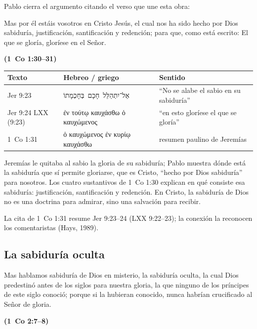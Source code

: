 \documentclass[11pt,letterpaper]{article}
\newcommand{\heb}[1]{\mbox{\foreignlanguage{hebrew}{#1}}}
\newcommand{\grc}[1]{\foreignlanguage{ancientgreek}{#1}}
\newcommand{\fuente}[1]{\par\hfill{\upshape\bfseries\small\textcolor{azul}{#1}}}
\begin{document}
Pablo cierra el argumento citando el verso que une esta obra:

\begin{cita}Mas por él estáis vosotros en Cristo Jesús, el cual nos ha sido hecho por Dios sabiduría, justificación, santificación y redención; para que, como está escrito: El que se gloría, gloríese en el Señor.\fuente{(1~Co 1:30--31)}\end{cita}

\begin{center}\small\renewcommand{\arraystretch}{1.3}
\begin{tabular}{@{}L{2.4cm}L{6.0cm}L{6.0cm}@{}}
\toprule
\textbf{Texto} & \textbf{Hebreo / griego} & \textbf{Sentido} \\ \midrule
Jer 9:23 & \heb{אַל־יִתְהַלֵּל חָכָם בְּחָכְמָתוֹ} & ``No se alabe el sabio en su sabiduría'' \\
Jer 9:24 LXX (9:23) & \grc{ἐν τούτῳ καυχάσθω ὁ καυχώμενος} & ``en esto gloríese el que se gloría'' \\
1~Co 1:31 & \grc{ὁ καυχώμενος ἐν κυρίῳ καυχάσθω} & resumen paulino de Jeremías \\
\bottomrule
\end{tabular}\end{center}

Jeremías le quitaba al sabio la gloria de su sabiduría; Pablo muestra dónde está la sabiduría que sí permite gloriarse, que es Cristo, ``hecho por Dios sabiduría'' para nosotros. Los cuatro sustantivos de 1~Co 1:30 explican en qué consiste esa sabiduría: justificación, santificación y redención. En Cristo, la sabiduría de Dios no es una doctrina para admirar, sino una salvación para recibir.

\begin{nota}[Precisión]
La cita de 1~Co 1:31 resume Jer 9:23--24 (LXX 9:22--23); la conexión la reconocen los comentaristas (Hays, 1989).
\end{nota}

\subsection{La sabiduría oculta}

\begin{cita}Mas hablamos sabiduría de Dios en misterio, la sabiduría oculta, la cual Dios predestinó antes de los siglos para nuestra gloria, la que ninguno de los príncipes de este siglo conoció; porque si la hubieran conocido, nunca habrían crucificado al Señor de gloria.\fuente{(1~Co 2:7--8)}\end{cita}
\end{document}
